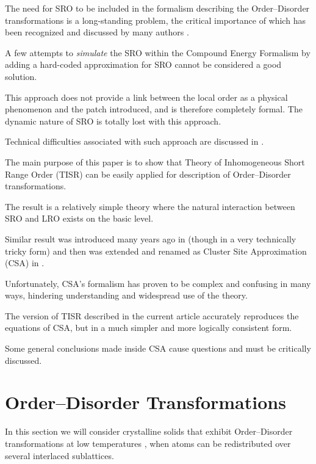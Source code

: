 \documentclass[12pt,abstract]{scrartcl}
\begin{document}
The need for SRO to be included in the formalism describing the Order--Disorder transformations is a long-standing problem, the critical importance of which has been recognized and discussed by many authors \cite{Sundman2018, gusev2013, krivoglaz1964, banerjee2010}.

A few attempts to \textit{simulate} the SRO within the  Compound Energy Formalism \cite{abe2003, liu2019, Sundman2018} by adding a hard-coded approximation for SRO  cannot be considered  a good solution.


This approach does not provide a link between the local order as a physical phenomenon and the patch introduced, and is therefore completely formal. 
The dynamic nature of SRO is totally lost with this approach.

Technical difficulties associated with such approach are discussed in \cite{Sundman2018}.

The main purpose of this paper is to show that  Theory of Inhomogeneous Short Range Order (TISR) \cite{TISR_p1} can be easily applied for description of Order--Disorder transformations.

The result is a relatively simple theory where the natural interaction between SRO and LRO exists on the basic level.

Similar result was introduced many years ago in \cite{Yang1945, Yang1947, li1949quasi}  (though in a very technically tricky form) and then was extended and renamed as Cluster Site Approximation (CSA)  in \cite{Oates1999, zhang_oates2001}.

Unfortunately, CSA's formalism has proven to be complex and confusing in many ways, hindering understanding and widespread use of the theory.

The version of TISR described in the current article accurately reproduces the equations of CSA, but in a much simpler and more logically consistent form.

Some general conclusions made inside CSA cause questions and must be critically discussed.




\section{Order--Disorder Transformations}

In this section we will consider crystalline solids that exhibit  Order--Disorder  transformations at low temperatures  \cite{hanslukas2007}, when atoms can be redistributed over several interlaced sublattices.
\end{document}
